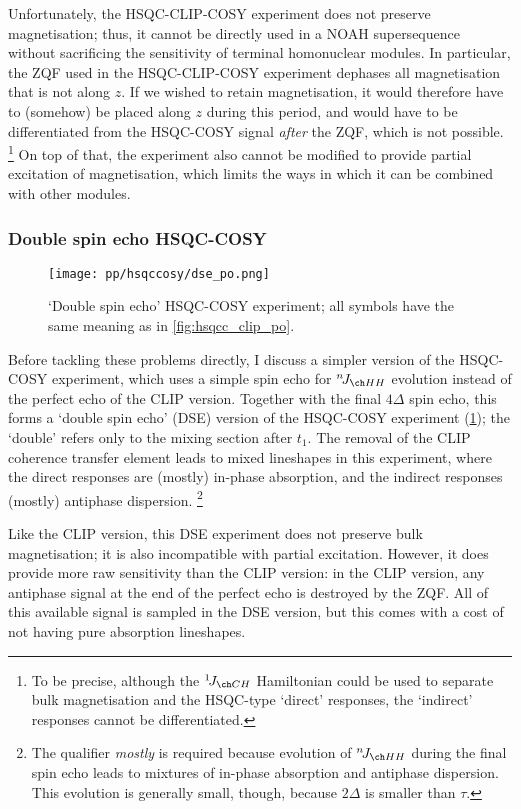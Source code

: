 Unfortunately, the HSQC-CLIP-COSY experiment does not preserve  magnetisation; thus, it cannot be directly used in a NOAH supersequence without sacrificing the sensitivity of terminal homonuclear modules.
In particular, the ZQF used in the HSQC-CLIP-COSY experiment dephases all magnetisation that is not along $z$.
If we wished to retain  magnetisation, it would therefore have to (somehow) be placed along $z$ during this period, and would have to be differentiated from the HSQC-COSY signal \textit{after} the ZQF, which is not possible.%
\footnote{To be precise, although the $\oneJ{CH}$ Hamiltonian could be used to separate bulk magnetisation and the HSQC-type `direct' responses, the `indirect' responses cannot be differentiated.}
On top of that, the experiment also cannot be modified to provide partial excitation of  magnetisation, which limits the ways in which it can be combined with other \carbon{} modules.


\subsubsection{Double spin echo HSQC-COSY}

\begin{figure}[!ht]
    \centering
    \texttt{[image: pp/hsqccosy/dse\_po.png]}%
    \caption[Double spin echo HSQC-COSY experiment]{
        `Double spin echo' HSQC-COSY experiment; all symbols have the same meaning as in \cref{fig:hsqcc_clip_po}.
    }
    \label{fig:hsqcc_dse_po}
\end{figure}

Before tackling these problems directly, I discuss a simpler version of the HSQC-COSY experiment, which uses a simple spin echo for $\nJ{HH}$ evolution instead of the perfect echo of the CLIP version.
Together with the final $4\Delta$ spin echo, this forms a `double spin echo' (DSE) version of the HSQC-COSY experiment (\cref{fig:hsqcc_dse_po}); the `double' refers only to the mixing section after $t_1$.
The removal of the CLIP coherence transfer element leads to mixed lineshapes in this experiment, where the direct responses are (mostly) in-phase absorption, and the indirect responses (mostly) antiphase dispersion.%
\footnote{The qualifier \textit{mostly} is required because evolution of $\nJ{HH}$ during the final spin echo leads to mixtures of in-phase absorption and antiphase dispersion. This evolution is generally small, though, because $2\Delta$ is smaller than $\tau$.}

Like the CLIP version, this DSE experiment does not preserve bulk magnetisation; it is also incompatible with partial  excitation.
However, it does provide more raw sensitivity than the CLIP version: in the CLIP version, any antiphase signal at the end of the perfect echo is destroyed by the ZQF.
All of this available signal is sampled in the DSE version, but this comes with a cost of not having pure absorption lineshapes.

